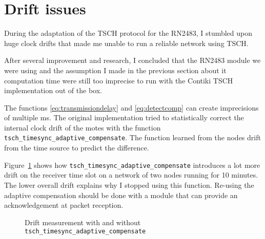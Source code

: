 \section{Drift issues\label{section:driftissues}}

During the adaptation of the TSCH protocol for the RN2483, I stumbled upon huge
clock drifts that made me unable to run a reliable network using TSCH.

After several improvement and research, I concluded that the RN2483
module we were using and the assumption I made in the previous section about it
computation time were still too imprecise to run with the Contiki TSCH
implementation out of the box.

The functions \ref{eq:transmissiondelay} and \ref{eq:detectcomp} can
create imprecisions of multiple ms.
The original implementation tried to statistically correct the internal clock
drift of the motes with the function
\lstinline{tsch_timesync_adaptive_compensate}.
The function learned from the nodes drift from the time source to predict the
difference.

Figure~\ref{fig:driftmeasurement} shows how
\lstinline{tsch_timesync_adaptive_compensate} introduces a lot more drift on the
receiver time slot on a network of two nodes running for 10 minutes.
The lower overall drift explains why I stopped using this function.
Re-using the adaptive compensation should be done with a module that can
provide an acknowledgement at packet reception.

\begin{figure}[H]
  \centering
  \caption{Drift measurement with and without \lstinline{tsch_timesync_adaptive_compensate}\label{fig:driftmeasurement}}
\end{figure}

